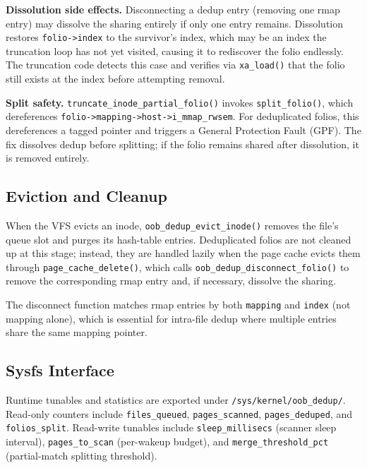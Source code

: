 \documentclass[conference]{IEEEtran}
\begin{document}
\textbf{Dissolution side effects.} Disconnecting a dedup entry (removing one rmap entry) may dissolve the sharing entirely if only one entry remains. Dissolution restores \texttt{folio->index} to the survivor's index, which may be an index the truncation loop has not yet visited, causing it to rediscover the folio endlessly. The truncation code detects this case and verifies via \texttt{xa\_load()} that the folio still exists at the index before attempting removal.

\textbf{Split safety.} \texttt{truncate\_inode\_partial\_folio()} invokes \texttt{split\_folio()}, which dereferences \texttt{folio->mapping->host->i\_mmap\_rwsem}. For deduplicated folios, this dereferences a tagged pointer and triggers a General Protection Fault (GPF). The fix dissolves dedup before splitting; if the folio remains shared after dissolution, it is removed entirely.

\subsection{Eviction and Cleanup}

When the VFS evicts an inode, \texttt{oob\_dedup\_evict\_inode()} removes the file's queue slot and purges its hash-table entries. Deduplicated folios are not cleaned up at this stage; instead, they are handled lazily when the page cache evicts them through \texttt{page\_cache\_delete()}, which calls \texttt{oob\_dedup\_disconnect\_folio()} to remove the corresponding rmap entry and, if necessary, dissolve the sharing.

The disconnect function matches rmap entries by both \texttt{mapping} and \texttt{index} (not mapping alone), which is essential for intra-file dedup where multiple entries share the same mapping pointer.

\subsection{Sysfs Interface}

Runtime tunables and statistics are exported under \texttt{/sys/kernel/oob\_dedup/}. Read-only counters include \texttt{files\_queued}, \texttt{pages\_scanned}, \texttt{pages\_deduped}, and \texttt{folios\_split}. Read-write tunables include \texttt{sleep\_millisecs} (scanner sleep interval), \texttt{pages\_to\_scan} (per-wakeup budget), and \texttt{merge\_threshold\_pct} (partial-match splitting threshold).

\end{document}
